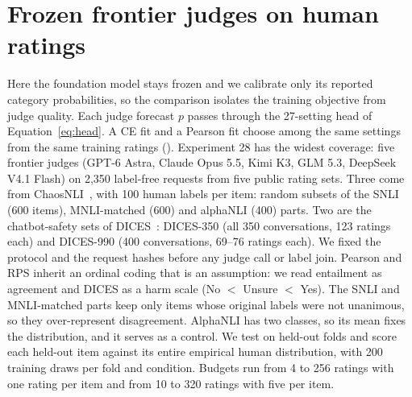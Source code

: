 \section{Frozen frontier judges on human ratings}
\label{sec:frozen}

Here the foundation model stays frozen and we calibrate only its reported category probabilities, so the comparison isolates the training objective from judge quality.
Each judge forecast $p$ passes through the 27-setting head of Equation~\eqref{eq:head}.
A CE fit and a Pearson fit choose among the same settings from the same training ratings ().
Experiment 28 has the widest coverage: five frontier judges (GPT-6 Astra, Claude Opus 5.5, Kimi K3, GLM 5.3, DeepSeek V4.1 Flash) on 2{,}350 label-free requests from five public rating sets.
Three come from ChaosNLI~\citep{nie2020chaosnli}, with 100 human labels per item: random subsets of the SNLI (600 items), MNLI-matched (600) and alphaNLI (400) parts.
Two are the chatbot-safety sets of DICES~\citep{aroyo2023dices}: DICES-350 (all 350 conversations, 123 ratings each) and DICES-990 (400 conversations, 69--76 ratings each).
We fixed the protocol and the request hashes before any judge call or label join.
Pearson and RPS inherit an ordinal coding that is an assumption: we read entailment as agreement and DICES as a harm scale (No $<$ Unsure $<$ Yes).
The SNLI and MNLI-matched parts keep only items whose original labels were not unanimous, so they over-represent disagreement.
AlphaNLI has two classes, so its mean fixes the distribution, and it serves as a control.
We test on held-out folds and score each held-out item against its entire empirical human distribution, with 200 training draws per fold and condition.
Budgets run from 4 to 256 ratings with one rating per item and from 10 to 320 ratings with five per item.

